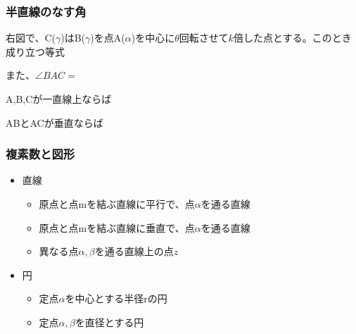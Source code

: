 \documentclass[10pt,dvipdfmx]{jsarticle}
\begin{document}
\subsubsection*{半直線のなす角}
\begin{table}[H]
  \begin{minipage}{0.7\textwidth}
    右図で、C($\gamma$)はB($\gamma$)を点A($\alpha$)を中心に$\theta$回転させて$k$倍した点とする。このとき成り立つ等式

    \vspace{15mm}

    また、$\angle BAC=$

    \vspace{10mm}

    A,B,Cが一直線上ならば

    \vspace{10mm}

    ABとACが垂直ならば

    \vspace{10mm}
  \end{minipage}
  \begin{minipage}{0.3\textwidth}

  \end{minipage}
\end{table}

\subsubsection*{複素数と図形}
\begin{itemize}
  \item 直線
        \begin{itemize}
          \item 原点と点mを結ぶ直線に平行で、点$\alpha$を通る直線\vspace{10mm}
          \item 原点と点mを結ぶ直線に垂直で、点$\alpha$を通る直線\vspace{10mm}
          \item 異なる点$\alpha,\beta$を通る直線上の点$z$\vspace{10mm}
        \end{itemize}
  \item 円
        \begin{itemize}
          \item 定点$\alpha$を中心とする半径rの円\vspace{10mm}
          \item 定点$\alpha, \beta$を直径とする円\vspace{10mm}
        \end{itemize}
\end{itemize}
\end{document}

